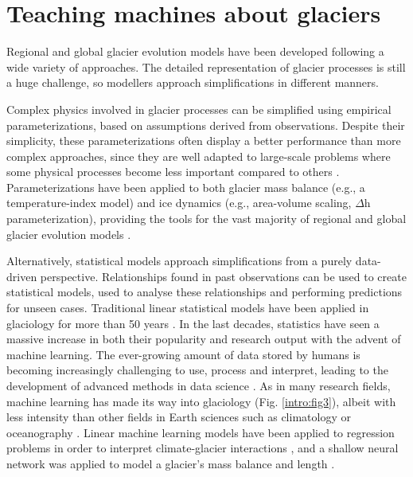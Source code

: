 \section{Teaching machines about glaciers}
\label{intro:ml}

Regional and global glacier evolution models have been developed following a wide variety of approaches. The detailed representation of glacier processes is still a huge challenge, so modellers approach simplifications in different manners. 

Complex physics involved in glacier processes can be simplified using empirical parameterizations, based on assumptions derived from observations. Despite their simplicity, these parameterizations often display a better performance than more complex approaches, since they are well adapted to large-scale problems where some physical processes become less important compared to others \citep{reveillet_relative_2018}. Parameterizations have been applied to both glacier mass balance (e.g., a temperature-index model) and ice dynamics (e.g., area-volume scaling, $\Delta$h parameterization), providing the tools for the vast majority of regional and global glacier evolution models \citep[e.g.,][]{marzeion_past_2012, huss_new_2015, maussion_open_2019, hock_glaciermip_2019}.

Alternatively, statistical models approach simplifications from a purely data-driven perspective. Relationships found in past observations can be used to create statistical models, used to analyse these relationships and performing predictions for unseen cases. Traditional linear statistical models have been applied in glaciology for more than 50 years \citep{hoinkes_glacier_1968, martin_correlation_1974}. In the last decades, statistics have seen a massive increase in both their popularity and research output with the advent of machine learning. The ever-growing amount of data stored by humans is becoming increasingly challenging to use, process and interpret, leading to the development of advanced methods in data science \citep{mjolsness_machine_2001}. As in many research fields, machine learning has made its way into glaciology (Fig.  \ref{intro:fig3}), albeit with less intensity than other fields in Earth sciences such as climatology \citep[e.g.,][]{liu_application_2016,ham_deep_2019,jiang_deep_2018} or oceanography \citep[e.g.,][]{ducournau_deep_2016,lguensat_learning_2019}. Linear machine learning models have been applied to regression problems in order to interpret climate-glacier interactions \citep{maussion_enso_2015}, and a shallow neural network was applied to model a glacier's mass balance and length \citep{steiner_application_2005,steiner_sensitivity_2008}. 

